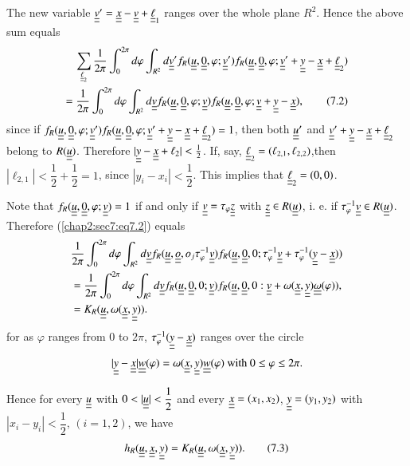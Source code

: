 The new variable $\uub{v}' = \uub{x} - \uub{v} + \uub{\ell}_{1}$ ranges over the whole plane $R^{2}$. Hence the above sum equals
\begin{align*}
\sum_{\uub{\ell}_{2}} \frac{1}{2\pi} \int_{0}^{2\pi} d\varphi \int_{R^{2}} d\uub{v}' f_{R} (\uub{u}, \uub{0}, \varphi ; \uub{v}') f_{R} (\uub{u}, \uub{0}, \varphi ; \uub{v}' + \uub{y} - \uub{x} + \uub{\ell}_{2})\\
= \frac{1}{2\pi} \int_{0}^{2\pi} d\varphi \int_{R^{2}} d\uub{v} f_{R} (\uub{u}, \uub{0}, \varphi ; \uub{v}) f_{R} (\uub{u}, \uub{0}, \varphi ; \uub{v} + \uub{y} - \uub{x}),\tag{7.2}\label{chap2:sec7:eq7.2}
\end{align*}
since if $f_{R} (\uub{u}, \uub{0}, \varphi ; \uub{v}') f_{R} (\uub{u}, \uub{0}, \varphi ; \uub{v}' + \uub{y} - \uub{x} + \uub{\ell}_{2}) = 1$, then both $\uub{u}'$ and $\uub{v}' + \uub{y} - \uub{x} + \uub{\ell}_{2}$ belong to $R(\uub{u})$. Therefore $|\uub{y} - \uub{x} + \ell_{2}| < \frac{1}{2}$. If, say, $\uub{\ell}_{2} = (\ell_{2,1}, \ell_{2,2})$,\pageoriginale then $|\ell_{2,1}| < \dfrac{1}{2} + \dfrac{1}{2} = 1$, since $|y_{i} - x_{i}|< \dfrac{1}{2}$. This implies that $\uub{\ell}_{2} = (0, 0)$.

Note that $f_{R} (\uub{u}, \uub{0}, \varphi; \uub{v}) = 1$ if and only if $\uub{v} = \tau_{\varphi} \uub{z}$ with $\uub{z} \in R(\uub{u})$, i. e. if $\tau_{\varphi}^{-1} \uub{v} \in R(\uub{u})$. Therefore (\ref{chap2:sec7:eq7.2}) equals
\begin{align*}
& \frac{1}{2\pi} \int_{0}^{2\pi} d\varphi \int_{R^{2}} d\uub{v} f_R (\uub{u}, \uub{o}, o_j \tau^{-1}_{\varphi}\uub{v}) f_{R} (\uub{u}, \uub{0}, 0 ; \tau_{\varphi}^{-1} \uub{v} + \tau_{\varphi}^{-1} (\uub{y} - \uub{x}))\\
& = \frac{1}{2\pi} \int_{0}^{2\pi} d\varphi \int_{R^{2}} d\uub{v} f_{R} (\uub{u}, \uub{0}, 0; \uub{v}) f_{R} (\uub{u}, \uub{0}, 0 : \uub{v} + \omega (\uub{x}, \uub{y}) \uub{\omega}(\varphi)),\\
& = K_{R} (\uub{u}, \omega(\uub{x}, \uub{y})).
\end{align*}
for as $\varphi$ ranges from $0$ to $2\pi$, $\tau_{\varphi}^{-1} (\uub{y}-\uub{x})$ ranges over the circle
$$
|\uub{y}-\uub{x}|\uub{w}(\varphi) = \omega(\uub{x}, \uub{y})\uub{w}(\varphi) \text{ with } 0 \leq \varphi \leq 2\pi.
$$

Hence for every $\uub{u}$ with $0 < |\uub{u}| < \dfrac{1}{2}$ and every $\uub{x} = (x_{1}, x_{2})$, $\uub{y} = (y_{1}, y_{2})$ with $|x_{i}-y_{i}| < \dfrac{1}{2}$, $(i = 1, 2)$, we have
\begin{equation*}
h_{R} (\uub{u}, \uub{x}, \uub{y}) = K_{R} (\uub{u}, \omega (\uub{x}, \uub{y})).\tag{7.3}\label{chap2:sec7:eq7.3}
\end{equation*}

